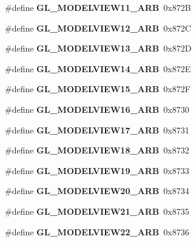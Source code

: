 \begin{DoxyCompactItemize}
\item 
\#define {\bfseries G\+L\+\_\+\+M\+O\+D\+E\+L\+V\+I\+E\+W11\+\_\+\+A\+R\+B}~0x872\+B\label{_s_d_l__opengl_8h_aed5e6112a973119f1371cd49ac59441a}

\item 
\#define {\bfseries G\+L\+\_\+\+M\+O\+D\+E\+L\+V\+I\+E\+W12\+\_\+\+A\+R\+B}~0x872\+C\label{_s_d_l__opengl_8h_ac4792a2be2daa154baccec97f7cd2d27}

\item 
\#define {\bfseries G\+L\+\_\+\+M\+O\+D\+E\+L\+V\+I\+E\+W13\+\_\+\+A\+R\+B}~0x872\+D\label{_s_d_l__opengl_8h_a9d5f45788d300eb39e7bbdb484b12d55}

\item 
\#define {\bfseries G\+L\+\_\+\+M\+O\+D\+E\+L\+V\+I\+E\+W14\+\_\+\+A\+R\+B}~0x872\+E\label{_s_d_l__opengl_8h_ad2524ece2a56056b605ecf35920f6332}

\item 
\#define {\bfseries G\+L\+\_\+\+M\+O\+D\+E\+L\+V\+I\+E\+W15\+\_\+\+A\+R\+B}~0x872\+F\label{_s_d_l__opengl_8h_a84c9aabf79ad7516e2e4f5e1d7435a03}

\item 
\#define {\bfseries G\+L\+\_\+\+M\+O\+D\+E\+L\+V\+I\+E\+W16\+\_\+\+A\+R\+B}~0x8730\label{_s_d_l__opengl_8h_af1ecbd1d1808edf1053d73006e0bd388}

\item 
\#define {\bfseries G\+L\+\_\+\+M\+O\+D\+E\+L\+V\+I\+E\+W17\+\_\+\+A\+R\+B}~0x8731\label{_s_d_l__opengl_8h_acdfd7a85cab798f8e14a42b4b4cf23b3}

\item 
\#define {\bfseries G\+L\+\_\+\+M\+O\+D\+E\+L\+V\+I\+E\+W18\+\_\+\+A\+R\+B}~0x8732\label{_s_d_l__opengl_8h_a2262cf727686c205f0caa6c0d278fc71}

\item 
\#define {\bfseries G\+L\+\_\+\+M\+O\+D\+E\+L\+V\+I\+E\+W19\+\_\+\+A\+R\+B}~0x8733\label{_s_d_l__opengl_8h_abe90204235839fcf2f22e8475a724954}

\item 
\#define {\bfseries G\+L\+\_\+\+M\+O\+D\+E\+L\+V\+I\+E\+W20\+\_\+\+A\+R\+B}~0x8734\label{_s_d_l__opengl_8h_a8de58099b0142fb99d353c73895e0cf2}

\item 
\#define {\bfseries G\+L\+\_\+\+M\+O\+D\+E\+L\+V\+I\+E\+W21\+\_\+\+A\+R\+B}~0x8735\label{_s_d_l__opengl_8h_ade827440bda3995911639746b687578f}

\item 
\#define {\bfseries G\+L\+\_\+\+M\+O\+D\+E\+L\+V\+I\+E\+W22\+\_\+\+A\+R\+B}~0x8736\label{_s_d_l__opengl_8h_aeee52676dd58650e79a6992ee01525d7}


\end{DoxyCompactItemize}

